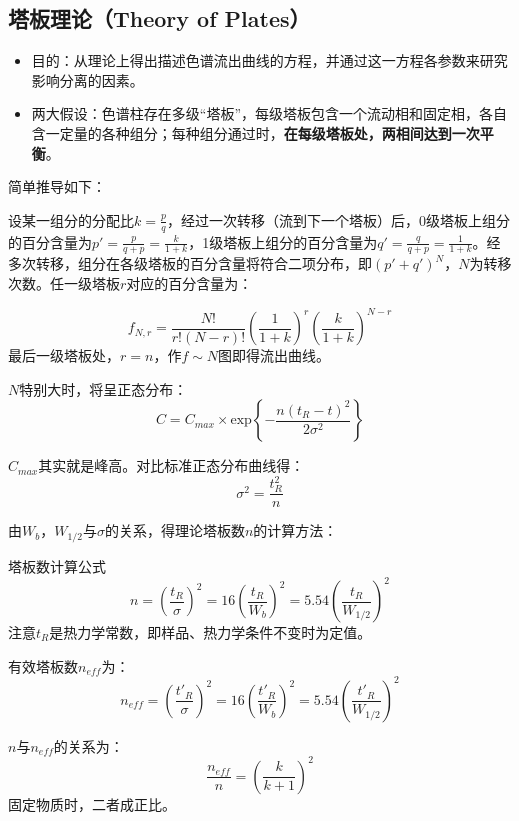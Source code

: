 \subsection{塔板理论（Theory of Plates）}
\begin{itemize}
	\item 目的：从理论上得出描述色谱流出曲线的方程，并通过这一方程各参数来研究影响分离的因素。
	\item 两大假设：色谱柱存在多级“塔板”，每级塔板包含一个流动相和固定相，各自含一定量的各种组分；每种组分通过时，\textbf{在每级塔板处，两相间达到一次平衡}。
\end{itemize}

简单推导如下：

设某一组分的分配比$k=\frac{p}{q}$，经过一次转移（流到下一个塔板）后，0级塔板上组分的百分含量为$p'=\frac{p}{q+p}=\frac{k}{1+k}$，1级塔板上组分的百分含量为$q'=\frac{q}{q+p}=\frac{1}{1+k}$。经多次转移，组分在各级塔板的百分含量将符合二项分布，即${(p'+q')^N}$，$N$为转移次数。任一级塔板$r$对应的百分含量为：

\begin{equation*}
	f_{N,r}=\dfrac{N!}{r!(N-r)!} \left(\dfrac{1}{1+k}\right)^r \left(\dfrac{k}{1+k}\right)^{N-r}
\end{equation*}
最后一级塔板处，$r=n$，作$f\sim N$图即得流出曲线。

$N$特别大时，将呈正态分布：
\begin{equation*}
	C=C_{max}\times \mathrm{exp}\left\{-\dfrac{n(t_R-t)^2}{2\sigma^2}\right\}
\end{equation*}

$C_{max}$其实就是峰高。对比标准正态分布曲线得：
\begin{equation*}
	{\sigma}^2=\dfrac{t_R^2}{n}
\end{equation*}

由$W_b$，$W_{1/2}$与$\sigma$的关系，得理论塔板数$n$的计算方法：

\begin{theorem*}{塔板数计算公式}{}
	\begin{equation}
		n={\left(\dfrac{t_R}{\sigma}\right)}^2=16{\left(\dfrac{t_R}{W_b}\right)}^2=5.54{\left(\dfrac{t_R}{W_{1/2}}\right)}^2\label{eqn:1.2}
	\end{equation}
	注意$t_R$是热力学常数，即样品、热力学条件不变时为定值。
	
	有效塔板数$n_{eff}$为：
	\begin{equation*}
		n_{eff}={\left(\dfrac{t'_R}{\sigma}\right)}^2=16{\left(\dfrac{t'_R}{W_b}\right)}^2=5.54{\left(\dfrac{t'_R}{W_{1/2}}\right)}^2
	\end{equation*}
	
	$n$与$n_{eff}$的关系为：
	\begin{equation}
		\dfrac{n_{eff}}{n}={\left(\dfrac{k}{k+1}\right)}^2
	\end{equation}
	固定物质时，二者成正比。
\end{theorem*}

